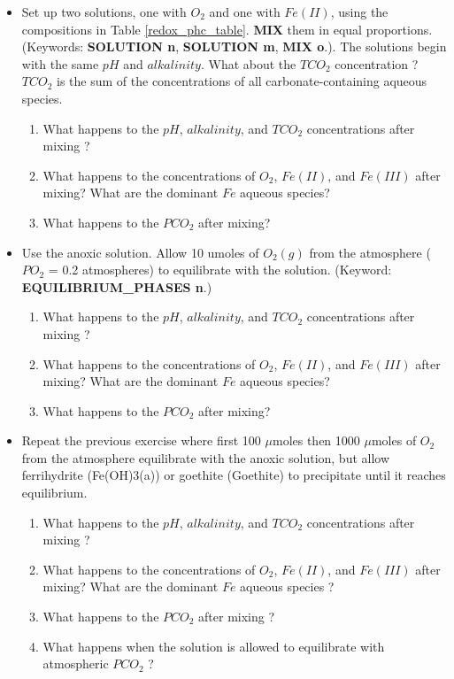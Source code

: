\begin{itemize}
\item Set up two solutions, one with $O_2$ and one with $Fe(II)$, using the compositions in Table \ref{redox_phc_table}. {\color{red} \textbf{MIX}} them in equal proportions.  (Keywords: {\color{red} \textbf{SOLUTION n}}, {\color{red} \textbf{SOLUTION m}}, {\color{red} \textbf{MIX o}}.).  
The solutions begin with the same $pH$ and $alkalinity$. What about the $TCO_2$ concentration ? 
$TCO_2$ is the sum of the concentrations of all carbonate-containing aqueous species. 
	\begin{enumerate} 
	\item What happens to the $pH$, $alkalinity$, and $TCO_2$ concentrations after mixing ?
	\item What happens to the concentrations of $O_2$, $Fe(II)$, and $Fe(III)$ after mixing?  What are the dominant $Fe$ aqueous species?
	\item What happens to the $PCO_2$ after mixing?
	\end{enumerate} 
\item Use the anoxic solution. Allow 10 umoles of $O_2(g)$ from the atmosphere ($PO_2$ = 0.2 atmospheres) to equilibrate with the solution. 
(Keyword: {\color{red} \textbf{EQUILIBRIUM\_PHASES n}}.)
  \begin{enumerate} 
	\item What happens to the $pH$, $alkalinity$, and $TCO_2$ concentrations after mixing ?
	\item What happens to the concentrations of $O_2$, $Fe(II)$, and $Fe(III)$ after mixing?  What are the dominant $Fe$ aqueous species?
	\item What happens to the $PCO_2$ after mixing?
  \end{enumerate}
\item Repeat the previous exercise where first 100 $\mu$moles then 1000 $\mu$moles of $O_2$ from the atmosphere equilibrate with the anoxic solution, but allow ferrihydrite (Fe(OH)3(a)) or goethite (Goethite) to precipitate until it reaches equilibrium.
	\begin{enumerate}  
	\item What happens to the $pH$, $alkalinity$, and $TCO_2$ concentrations after mixing ?
	\item What happens to the concentrations of $O_2$, $Fe(II)$, and $Fe(III)$ after mixing?  What are the dominant $Fe$ aqueous species ?
	\item What happens to the $PCO_2$ after mixing ?
	\item What happens when the solution is allowed to equilibrate with atmospheric $PCO_2$ ?

\end{enumerate}
\end{itemize}
